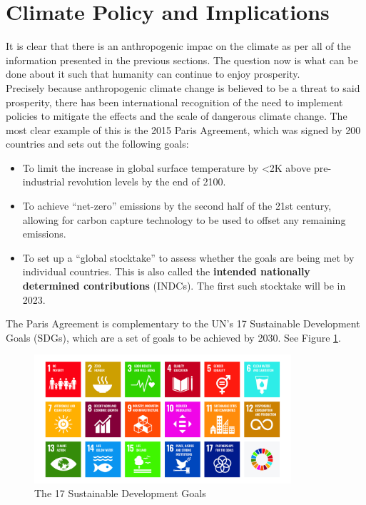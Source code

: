 \section{Climate Policy and Implications}
\label{sec:climate_policy}

It is clear that there is an anthropogenic impac on the climate as per all of the
information presented in the previous sections. The question now is what can be done
about it such that humanity can continue to enjoy prosperity.\\

Precisely because anthropogenic climate change is believed to be a threat to said
prosperity, there has been international recognition of the need to implement 
policies to mitigate the effects and the scale of dangerous climate change. The 
most clear example of this is the 2015 Paris Agreement, which was signed by 200
countries and sets out the following goals:
\begin{itemize}
    \item To limit the increase in global surface temperature by \textless{}2K above 
    pre-industrial revolution levels by the end of 2100.
    \item To achieve ``net-zero'' emissions by the second half of the 21st century,
    allowing for carbon capture technology to be used to offset any remaining
    emissions.
    \item To set up a ``global stocktake'' to assess whether the goals are being
    met by individual countries. This is also called the \textbf{intended nationally
    determined contributions} (INDCs). The first such stocktake will be in 2023.
\end{itemize}

The Paris Agreement is complementary to the UN's 17 Sustainable Development Goals
(SDGs), which are a set of goals to be achieved by 2030. See Figure \ref{fig:SDGs}.

\begin{figure}[ht]
    \centering
    \includegraphics[width=0.85\textwidth]{figures/sdg.jpeg}
    \caption{The 17 Sustainable Development Goals}
    \label{fig:SDGs}
\end{figure}


